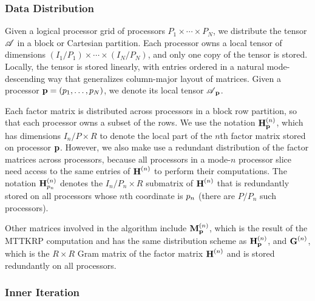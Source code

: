 \subsubsection{Data Distribution}
\label{sec:datadist}

Given a logical processor grid of processors $P_1\times \cdots \times P_N$, we distribute the tensor $\TA$ in a block or Cartesian partition.
Each processor owns a local tensor of dimensions $(I_1/P_1)\times \cdots \times (I_N/P_N)$, and only one copy of the tensor is stored.
Locally, the tensor is stored linearly, with entries ordered in a natural mode-descending way that generalizes column-major layout of matrices.
Given a processor $\V{p}=(\VE{p}{1},\dots,\VE{p}{N})$, we denote its local tensor $\TA_{\V{p}}$.

Each factor matrix is distributed across processors in a block row partition, so that each processor owns a subset of the rows.
We use the notation $\Mn{H}{n}_{\V{p}}$, which has dimensions $I_n/P\times R$ to denote the local part of the $n$th factor matrix stored on processor $\V{p}$.
However, we also make use a redundant distribution of the factor matrices across processors, because all processors in a mode-$n$ processor slice need access to the same entries of $\Mn{H}{n}$ to perform their computations.
The notation $\Mn{H}{n}_{\VE{p}{n}}$ denotes the $I_n/P_n\times R$ submatrix of $\Mn{H}{n}$ that is redundantly stored on all processors whose $n$th coordinate is $\VE{p}{n}$ (there are $P/P_n$ such processors).

Other matrices involved in the algorithm include $\Mn{M}{n}_{\V{p}}$, which is the result of the MTTKRP computation and has the same distribution scheme as $\Mn{H}{n}_{\V{p}}$, and $\Mn{G}{n}$, which is the $R\times R$ Gram matrix of the factor matrix $\Mn{H}{n}$ and is stored redundantly on all processors.

\subsubsection{Inner Iteration}

